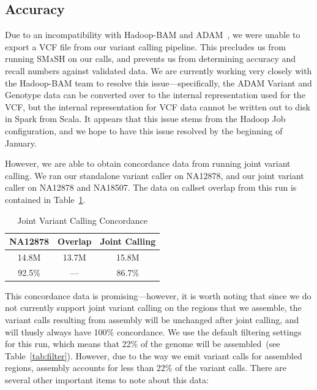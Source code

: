 \documentclass{acm_proc_article-sp}
\begin{document}
\subsection{Accuracy}
\label{sec:accuracy}


Due to an incompatibility with Hadoop-BAM and ADAM~\cite{massie13, niemenmaa12}, we were unable to export a VCF file from our variant
calling pipeline. This precludes us from running \textsc{SMaSH} on our calls, and prevents us from determining accuracy and recall numbers
against validated data. We are currently working very closely with the Hadoop-BAM team to resolve this issue---specifically, the ADAM Variant
and Genotype data can be converted over to the internal representation used for the VCF, but the internal representation for VCF data cannot
be written out to disk in Spark from Scala. It appears that this issue stems from the Hadoop Job configuration, and we hope to have this issue
resolved by the beginning of January.

However, we are able to obtain concordance data from running joint variant calling. We ran our standalone variant caller on NA12878, and
our joint variant caller on NA12878 and NA18507. The data on callset overlap from this run is contained in Table~\ref{tab:concordance}.

\begin{table}[h]
\caption{Joint Variant Calling Concordance}
\begin{center}
\begin{tabular}{| c | c | c |}
\hline
\bf NA12878 & \bf Overlap & \bf Joint Calling \\
\hline
\hline
14.8M & 13.7M & 15.8M \\
92.5\% & --- & 86.7\% \\
\hline
\end{tabular}
\end{center}
\label{tab:concordance}
\end{table}

This concordance data is promising---however, it is worth noting that since we do not currently support joint variant calling on the regions
that we assemble, the variant calls resulting from assembly will be unchanged after joint calling, and will thusly always have 100\%
concordance. We use the default filtering settings for this run, which means that 22\% of the genome will be assembled~(see
Table~\ref{tab:filter}). However, due to the way we emit variant calls for assembled regions, assembly accounts for less than 22\%
of the variant calls. There are several other important items to note about this data:
\end{document}

